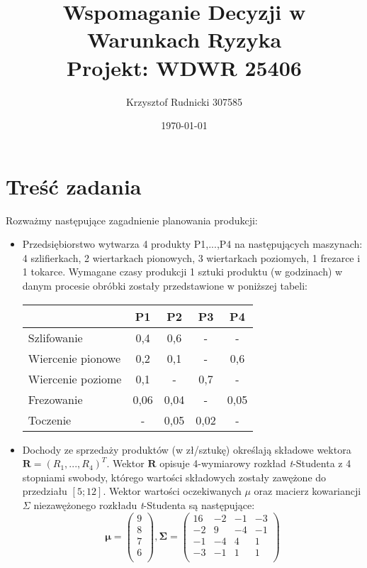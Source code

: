 \documentclass[11pt,a4paper]{article}
\title{Wspomaganie Decyzji w Warunkach Ryzyka\\\large \medskip Projekt: WDWR 25406\\}
\author{Krzysztof Rudnicki 307585}
\date{\today}
\begin{document}
\maketitle

\section*{Treść zadania}
Rozważmy następujące zagadnienie planowania produkcji:

\begin{itemize}
  \item Przedsiębiorstwo wytwarza 4 produkty P1,...,P4 na następujących maszynach: 4 szlifierkach, 
  2 wiertarkach pionowych, 3 wiertarkach poziomych, 1 frezarce i 1 tokarce. Wymagane czasy produkcji 
  1 sztuki produktu (w godzinach) w danym procesie obróbki zostały przedstawione w poniższej tabeli:\\
  \begin{center}
  \begin{tabular}{l*{4}{c}}
  	\hline
              			& P1 & P2 & P3 & P4 \\
	\hline
	Szlifowanie 		& 0,4 & 0,6 & - & - \\
	Wiercenie pionowe   & 0,2 & 0,1 & - & 0,6 \\
	Wiercenie poziome 	& 0,1 & - & 0,7 & -  \\
	Frezowanie  	 	& 0,06 & 0,04 & - & 0,05 \\
	Toczenie	     	& - & 0,05 & 0,02 & - \\
	\hline
	\end{tabular}
	\end{center}

  \item Dochody ze sprzedaży produktów (w zł/sztukę) określają składowe wektora 
  $\mathbf{R} = (R_{1},...,R_{4})^{T}$. Wektor $\mathbf{R}$ opisuje 4-wymiarowy rozkład 
  \textit{t}-Studenta z 4 stopniami swobody, którego wartości składowych zostały zawężone do 
  przedziału $[5;12]$. Wektor wartości oczekiwanych $\mu$ oraz macierz kowariancji 
  $\Sigma$ niezawężonego rozkładu \textit{t}-Studenta są następujące:
  \begin{displaymath}
\mathbf{\mu} = 
 \begin{pmatrix}
  9 \\ 8 \\ 7 \\ 6 \\  
 \end{pmatrix},
 \mathbf{\Sigma} = 
 \begin{pmatrix}
  16 & -2 & -1 & -3 \\
  -2 & 9 & -4 & -1 \\ 
  -1 & -4 & 4 & 1 \\
  -3 & -1 & 1 & 1 \\  
 \end{pmatrix}
  \end{displaymath}
  

\end{itemize}
\end{document}
